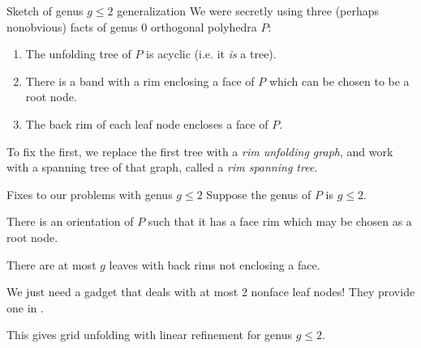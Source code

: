 \documentclass{beamer}
\theoremstyle{plain}
\begin{document}
\begin{frame}{Sketch of genus $g \leq 2$ generalization}
  We were secretly using three (perhaps nonobvious) facts of genus 0 orthogonal polyhedra $P$:
  \begin{enumerate}
    \pause \item The unfolding tree of $P$ is acyclic (i.e. it \emph{is} a tree).
    \pause \item There is a band with a rim enclosing a face of $P$ which can be chosen to be a root node.
    \pause \item The back rim of each leaf node encloses a face of $P$.
  \end{enumerate}
  \pause To fix the first, we replace the first tree with a \emph{rim unfolding graph}, and work with a spanning tree of that graph, called a \emph{rim spanning tree.}
\end{frame}

\begin{frame}{Fixes to our problems with genus $g \leq 2$}
  Suppose the genus of $P$ is $g \leq 2$.
  \pause 
  \begin{lemma}
    There is an orientation of $P$ such that it has a face rim which may be chosen as a root node.
  \end{lemma}
  \pause
  \begin{lemma}
    There are at most $g$ leaves with back rims not enclosing a face. 
  \end{lemma}
  \pause We just need a gadget that deals with at most 2 nonface leaf nodes!
  They provide one in .

  This gives grid unfolding with linear refinement for genus $g \leq 2$.
\end{frame}
\end{document}
